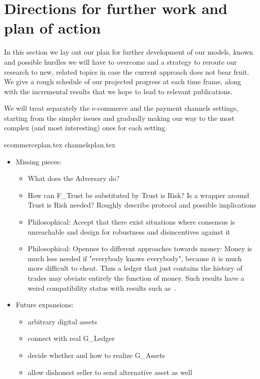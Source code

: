 \section{Directions for further work and plan of action}
\label{sec:plan}
  In this section we lay out our plan for further development of our models, known and
  possible hurdles we will have to overcome and a strategy to reroute our research to new,
  related topics in case the current approach does not bear fruit. We give a rough
  schedule of our projected progress at each time frame, along with the incremental
  results that we hope to lead to relevant publications.

  We will treat separately the e-commerce and the payment channels settings, starting from
  the simpler issues and gradually making our way to the most complex (and most
  interesting) ones for each setting.

  {ecommerceplan.tex}
  {channelsplan.tex}
  \begin{itemize}
    \item Missing pieces:
    \begin{itemize}
      \item What does the Adversary do?
      \item How can F\_Trust be substituted by Trust is Risk? Is a wrapper around Trust is
      Risk needed? Roughly describe protocol and possible implications
      \item Philosophical: Accept that there exist situations where consensus is
      unreachable and design for robustness and disincentives against it
      \item Philosophical: Opennes to different approaches towards money: Money is much
      less needed if "everybody knows everybody", because it is much more difficult to
      cheat. Thus a ledger that just contains the history of trades may obviate entirely
      the function of money. Such results have a weird compatibility status with results
      such as~\cite{marketequilibrium}.
    \end{itemize}
    \item Future expansions:
    \begin{itemize}
      \item arbitrary digital assets
      \item connect with real G\_Ledger
      \item decide whether and how to realize G\_Assets
      \item allow dishonest seller to send alternative asset as well
    \end{itemize}
  \end{itemize}
